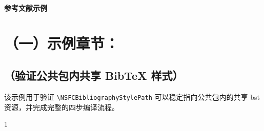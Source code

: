 \documentclass[12pt,UTF8,AutoFakeBold=2.5,a4paper,fontset=none]{ctexart}
\begin{document}
{\centering
{\sanhao \templatefont \bfseries 参考文献示例}\par
}

\section{（一）示例章节：}
\subsection{（验证公共包内共享 BibTeX 样式）}

\NSFCBodyText
该示例用于验证 \verb|\NSFCBibliographyStylePath| 可以稳定指向公共包内的共享 bst 资源，并完成完整的四步编译流程\cite{lamport1994latex}。

\begin{spacing}{1}
\wuhao


\end{spacing}
\end{document}
